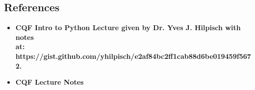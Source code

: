 \documentclass{report}
\theoremstyle{plain}
\theoremstyle{definition}
\begin{document}
\subsection*{References}

\begin{itemize}
  \item \textbf{CQF Intro to Python Lecture given by Dr. Yves J. Hilpisch with notes\\at: https://gist.github.com/yhilpisch/e2af84bc2ff1cab88d6be019459f5672.}

  \item \textbf{CQF Lecture Notes}
\end{itemize}
\end{document}
